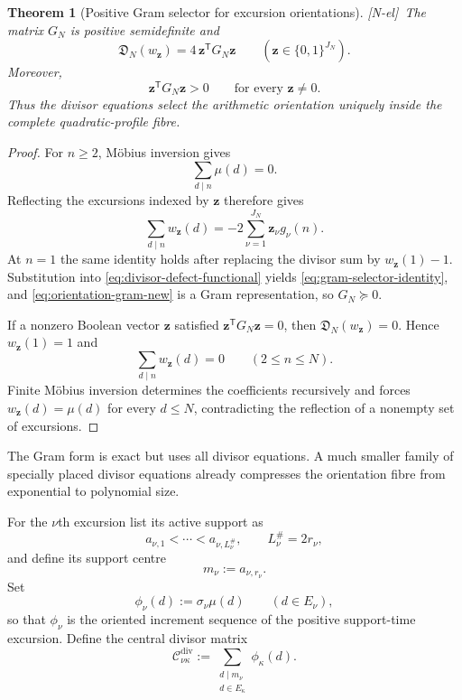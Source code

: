 \documentclass[11pt]{amsart}
\numberwithin{equation}{section}
\theoremstyle{plain}
\newtheorem{theorem}{Theorem}[section]
\theoremstyle{definition}
\theoremstyle{remark}
\newcommand{\tagNE}{\textup{[N-el]}}
\begin{document}
\begin{theorem}[Positive Gram selector for excursion orientations]
\label{thm:positive-gram-selector}
\tagNE\ The matrix $G_N$ is positive semidefinite and
\begin{equation}
\mathfrak D_N(w_\mathbf z)
=
4\,\mathbf z^{\mathsf T}G_N\mathbf z
\qquad
(\mathbf z\in\{0,1\}^{J_N}).
\label{eq:gram-selector-identity}
\end{equation}
Moreover,
\begin{equation}
\mathbf z^{\mathsf T}G_N\mathbf z>0
\qquad\text{for every }\mathbf z\ne0.
\label{eq:boolean-strict-positivity}
\end{equation}
Thus the divisor equations select the arithmetic orientation uniquely inside the complete quadratic-profile fibre.
\end{theorem}

\begin{proof}
For $n\ge2$, M\"obius inversion gives
\[
\sum_{d\mid n}\mu(d)=0.
\]
Reflecting the excursions indexed by $\mathbf z$ therefore gives
\[
\sum_{d\mid n}w_\mathbf z(d)
=-2\sum_{\nu=1}^{J_N}\mathbf z_\nu g_\nu(n).
\]
At $n=1$ the same identity holds after replacing the divisor sum by $w_\mathbf z(1)-1$.  Substitution into \eqref{eq:divisor-defect-functional} yields \eqref{eq:gram-selector-identity}, and \eqref{eq:orientation-gram-new} is a Gram representation, so $G_N\succeq0$.

If a nonzero Boolean vector $\mathbf z$ satisfied $\mathbf z^{\mathsf T}G_N\mathbf z=0$, then $\mathfrak D_N(w_\mathbf z)=0$.  Hence $w_\mathbf z(1)=1$ and
\[
\sum_{d\mid n}w_\mathbf z(d)=0\qquad(2\le n\le N).
\]
Finite M\"obius inversion determines the coefficients recursively and forces $w_\mathbf z(d)=\mu(d)$ for every $d\le N$, contradicting the reflection of a nonempty set of excursions.
\end{proof}

The Gram form is exact but uses all divisor equations.  A much smaller family of specially placed divisor equations already compresses the orientation fibre from exponential to polynomial size.

For the $\nu$th excursion list its active support as
\[
a_{\nu,1}<\cdots<a_{\nu,L_\nu^\#},
\qquad L_\nu^\#=2r_\nu,
\]
and define its support centre
\[
m_\nu:=a_{\nu,r_\nu}.
\]
Set
\[
\phi_\nu(d):=\sigma_\nu\mu(d)
\qquad(d\in E_\nu),
\]
so that $\phi_\nu$ is the oriented increment sequence of the positive support-time excursion.  Define the central divisor matrix
\begin{equation}
\mathscr C^{\mathrm{div}}_{\nu\kappa}
:=
\sum_{\substack{d\mid m_\nu\\ d\in E_\kappa}}
\phi_\kappa(d).
\label{eq:central-divisor-matrix-new}
\end{equation}
\end{document}
